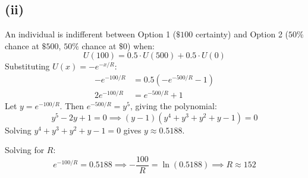 \documentclass[11pt]{article}
\begin{document}
\subsection*{(ii)}

An individual is indifferent between Option 1 ($\$100$ certainty) and Option 2 ($50\%$ chance at $\$500$, $50\%$ chance at $\$0$) when:
\[
U(100) = 0.5 \cdot U(500) + 0.5 \cdot U(0)
\]
Substituting $U(x) = -e^{-x/R}$:
\begin{align*}
-e^{-100/R} &= 0.5\left(-e^{-500/R} - 1\right) \\[1ex]
2e^{-100/R} &= e^{-500/R} + 1
\end{align*}
Let $y = e^{-100/R}$. Then $e^{-500/R} = y^5$, giving the polynomial:
\[
y^5 - 2y + 1 = 0 \implies (y - 1)(y^4 + y^3 + y^2 + y - 1) = 0
\]
Solving $y^4 + y^3 + y^2 + y - 1 = 0$ gives $y \approx 0.5188$.

Solving for $R$:
\[
e^{-100/R} = 0.5188 \implies -\frac{100}{R} = \ln(0.5188) \implies R \approx 152
\]
\end{document}
